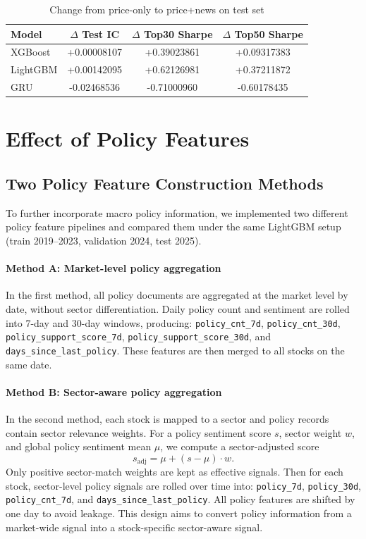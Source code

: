 \begin{table}[htbp]
\centering
\caption{Change from price-only to price+news on test set}
\label{tab:news-vs-price-delta}
\begin{tabular}{lccc}
\hline
Model & $\Delta$ Test IC & $\Delta$ Top30 Sharpe & $\Delta$ Top50 Sharpe \\
\hline
XGBoost & +0.00008107 & +0.39023861 & +0.09317383 \\
LightGBM & +0.00142095 & +0.62126981 & +0.37211872 \\
GRU & -0.02468536 & -0.71000960 & -0.60178435 \\
\hline
\end{tabular}
\end{table}

\section{Effect of Policy Features}

\subsection{Two Policy Feature Construction Methods}

To further incorporate macro policy information, we implemented two different policy feature pipelines and compared them under the same LightGBM setup (train 2019--2023, validation 2024, test 2025).

\paragraph{Method A: Market-level policy aggregation}
In the first method, all policy documents are aggregated at the market level by date, without sector differentiation. Daily policy count and sentiment are rolled into 7-day and 30-day windows, producing:
\texttt{policy\_cnt\_7d}, \texttt{policy\_cnt\_30d}, \texttt{policy\_support\_score\_7d}, \texttt{policy\_support\_score\_30d}, and \texttt{days\_since\_last\_policy}.
These features are then merged to all stocks on the same date.

\paragraph{Method B: Sector-aware policy aggregation}
In the second method, each stock is mapped to a sector and policy records contain sector relevance weights. For a policy sentiment score $s$, sector weight $w$, and global policy sentiment mean $\mu$, we compute a sector-adjusted score
\[
s_{\text{adj}} = \mu + (s - \mu) \cdot w.
\]
Only positive sector-match weights are kept as effective signals. Then for each stock, sector-level policy signals are rolled over time into:
\texttt{policy\_7d}, \texttt{policy\_30d}, \texttt{policy\_cnt\_7d}, and \texttt{days\_since\_last\_policy}.
All policy features are shifted by one day to avoid leakage.
This design aims to convert policy information from a market-wide signal into a stock-specific sector-aware signal.

